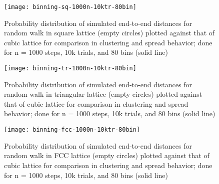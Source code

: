 \documentclass[12pt, oneside]{article}
\begin{document}
\begin{figure}[htbp]
   \centering
   \texttt{[image: binning-sq-1000n-10ktr-80bin]} %
   \caption{Probability distribution of simulated end-to-end distances for random walk in square lattice (empty circles) plotted against that of cubic lattice for comparison in clustering and spread behavior; done for n = 1000 steps, 10k trials, and 80 bins (solid line)}
   \label{fig:sqbinning}
\end{figure}

\begin{figure}[htbp]
   \centering
   \texttt{[image: binning-tr-1000n-10ktr-80bin]} %
   \caption{Probability distribution of simulated end-to-end distances for random walk in triangular lattice (empty circles) plotted against that of cubic lattice for comparison in clustering and spread behavior; done for n = 1000 steps, 10k trials, and 80 bins (solid line)}
   \label{fig:trbinning}
\end{figure}

\begin{figure}[htbp]
   \centering
   \texttt{[image: binning-fcc-1000n-10ktr-80bin]} %
   \caption{Probability distribution of simulated end-to-end distances for random walk in FCC lattice (empty circles) plotted against that of cubic lattice for comparison in clustering and spread behavior; done for n = 1000 steps, 10k trials, and 80 bins (solid line)}
   \label{fig:fccbinning}
\end{figure}

\end{document}
